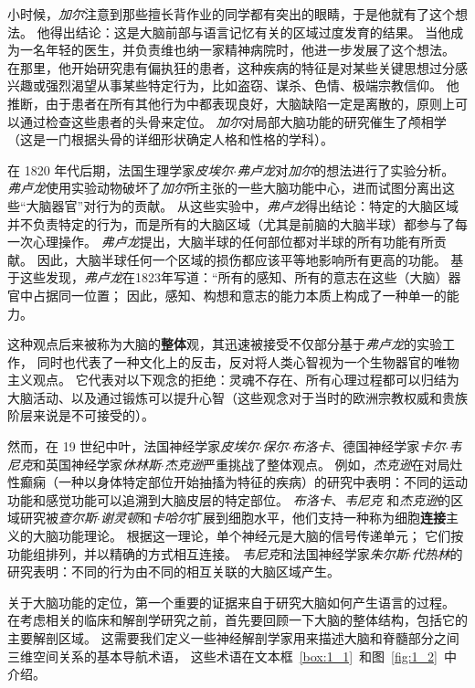 小时候，\textit{加尔}注意到那些擅长背作业的同学都有突出的眼睛，于是他就有了这个想法。
他得出结论：这是大脑前部与语言记忆有关的区域过度发育的结果。
当他成为一名年轻的医生，并负责维也纳一家精神病院时，他进一步发展了这个想法。
在那里，他开始研究患有偏执狂的患者，这种疾病的特征是对某些关键思想过分感兴趣或强烈渴望从事某些特定行为，比如盗窃、谋杀、色情、极端宗教信仰。
他推断，由于患者在所有其他行为中都表现良好，大脑缺陷一定是离散的，原则上可以通过检查这些患者的头骨来定位。
\textit{加尔}对局部大脑功能的研究催生了颅相学（这是一门根据头骨的详细形状确定人格和性格的学科）。


在 1820 年代后期，法国生理学家\textit{皮埃尔$\cdot$弗卢龙}对\textit{加尔}的想法进行了实验分析。 
\textit{弗卢龙}使用实验动物破坏了\textit{加尔}所主张的一些大脑功能中心，进而试图分离出这些“大脑器官”对行为的贡献。
从这些实验中，\textit{弗卢龙}得出结论：特定的大脑区域并不负责特定的行为，而是所有的大脑区域（尤其是前脑的大脑半球）都参与了每一次心理操作。
\textit{弗卢龙}提出，大脑半球的任何部位都对半球的所有功能有所贡献。
因此，大脑半球任何一个区域的损伤都应该平等地影响所有更高的功能。
基于这些发现，\textit{弗卢龙}在1823年写道：“所有的感知、所有的意志在这些（大脑）器官中占据同一位置；
因此，感知、构想和意志的能力本质上构成了一种单一的能力。


这种观点后来被称为大脑的\textbf{整体}观，其迅速被接受不仅部分基于\textit{弗卢龙}的实验工作，
同时也代表了一种文化上的反击，反对将人类心智视为一个生物器官的唯物主义观点。
它代表对以下观念的拒绝：灵魂不存在、所有心理过程都可以归结为大脑活动、以及通过锻炼可以提升心智（这些观念对于当时的欧洲宗教权威和贵族阶层来说是不可接受的）。


然而，在 19 世纪中叶，法国神经学家\textit{皮埃尔$\cdot$保尔$\cdot$布洛卡}、德国神经学家\textit{卡尔$\cdot$韦尼克}和英国神经学家\textit{休林斯$\cdot$杰克逊}严重挑战了整体观点。
例如，\textit{杰克逊}在对局灶性癫痫（一种以身体特定部位开始抽搐为特征的疾病）的研究中表明：不同的运动功能和感觉功能可以追溯到大脑皮层的特定部位。
\textit{布洛卡}、\textit{韦尼克} 和\textit{杰克逊}的区域研究被\textit{查尔斯$\cdot$谢灵顿}和\textit{卡哈尔}扩展到细胞水平，他们支持一种称为细胞\textbf{连接}主义的大脑功能理论。
根据这一理论，单个神经元是大脑的信号传递单元；
它们按功能组排列，并以精确的方式相互连接。
\textit{韦尼克}和法国神经学家\textit{朱尔斯$\cdot$代热林}的研究表明：不同的行为由不同的相互关联的大脑区域产生。


关于大脑功能的定位，第一个重要的证据来自于研究大脑如何产生语言的过程。
在考虑相关的临床和解剖学研究之前，首先要回顾一下大脑的整体结构，包括它的主要解剖区域。
这需要我们定义一些神经解剖学家用来描述大脑和脊髓部分之间三维空间关系的基本导航术语，
这些术语在文本框~\ref{box:1_1}~和图~\ref{fig:1_2}~中介绍。


